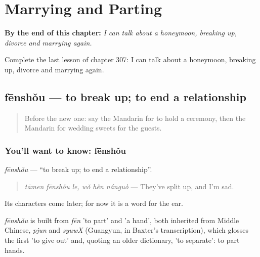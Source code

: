 
\chapter{Marrying and Parting}
\label{ch:zh-marrying-and-parting}

\begin{chapteropening}
\textbf{By the end of this chapter:} \emph{I can talk about a honeymoon, breaking up, divorce and marrying again.}

Complete the last lesson of chapter 307: I can talk about a honeymoon, breaking up, divorce and marrying again.
\end{chapteropening}

\section[fēnshǒu]{fēnshǒu — to break up; to end a relationship}

\label{lesson:ZH-C307-fenshou}



\begin{quote}
Before the new one: say the Mandarin for to hold a ceremony, then the Mandarin for wedding sweets for the guests.
\end{quote}

\subsection*{You'll want to know: fēnshǒu}
\emph{fēnshǒu} — \textquotedblleft{}to break up; to end a relationship\textquotedblright{}.

\begin{quote}
\emph{tāmen fēnshǒu le, wǒ hěn nánguò} — They've split up, and I'm sad.
\end{quote}

Its characters come later; for now it is a word for the ear.

\begin{cousinweb}
\emph{fēnshǒu} is built from \emph{fēn} 'to part' and  'a hand', both inherited from Middle Chinese, \emph{pjun} and \emph{syuwX} (Guangyun, in Baxter's transcription), which glosses the first 'to give out' and, quoting an older dictionary, 'to separate': to part hands.
\end{cousinweb}

